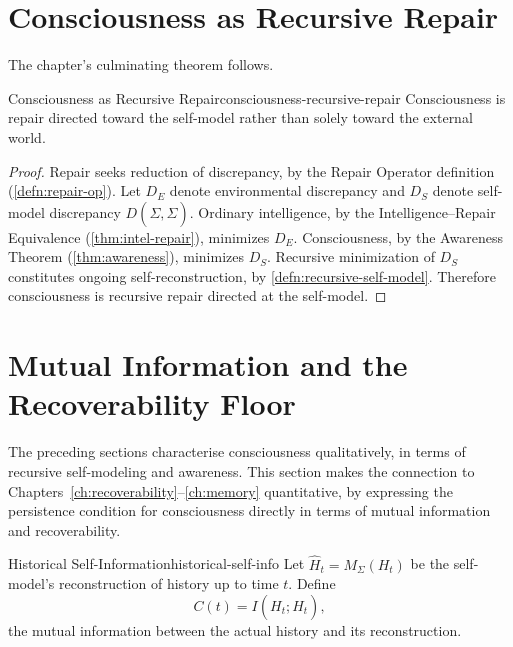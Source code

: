 \documentclass[12pt,twoside,openright]{book}
\begin{document}
\section{Consciousness as Recursive Repair}
\label{sec:ch21-recursive-repair}

The chapter's culminating theorem follows.

\begin{theorem}{Consciousness as Recursive Repair}{consciousness-recursive-repair}
  Consciousness is repair directed toward the self-model
  rather than solely toward the external world.
\end{theorem}

\begin{proof}
  Repair seeks reduction of discrepancy, by the Repair
  Operator definition (\cref{defn:repair-op}). Let $D_E$
  denote environmental discrepancy and $D_S$ denote
  self-model discrepancy $D(\Sigma, \hat{\Sigma})$. Ordinary
  intelligence, by the Intelligence--Repair Equivalence
  (\cref{thm:intel-repair}), minimizes $D_E$. Consciousness,
  by the Awareness Theorem (\cref{thm:awareness}), minimizes
  $D_S$. Recursive minimization of $D_S$ constitutes
  ongoing self-reconstruction, by
  \cref{defn:recursive-self-model}. Therefore consciousness
  is recursive repair directed at the self-model.
\end{proof}

\section{Mutual Information and the Recoverability Floor}
\label{sec:ch21-mutual-info}

The preceding sections characterise consciousness
qualitatively, in terms of recursive self-modeling and
awareness. This section makes the connection to
Chapters~\ref{ch:recoverability}--\ref{ch:memory}
quantitative, by expressing the persistence condition for
consciousness directly in terms of mutual information and
recoverability.

\begin{definition}{Historical Self-Information}{historical-self-info}
  Let $\hat{H}_t = M_\Sigma(H_t)$ be the self-model's
  reconstruction of history up to time $t$. Define
  \[
    C(t) = I(H_t; \hat{H}_t),
  \]
  the mutual information between the actual history and its
  reconstruction.
\end{definition}
\end{document}
